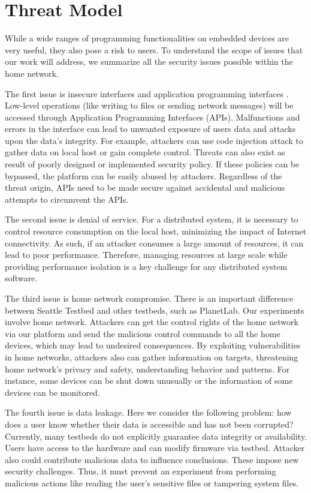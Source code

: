 \section{Threat Model}
\label{sec.threat_model}
While a wide ranges of programming functionalities on embedded devices are 
very useful, they also pose a risk to users. To understand the scope of 
issues that our work will address, we summarize all the security issues 
possible within the home network.

The first issue is insecure interfaces and application programming interfaces
. Low-level operations (like writing to files or sending network messages) 
will be accessed through Application Programming Interfaces (APIs). 
Malfunctions and errors in the interface can lead to unwanted exposure of 
users data and attacks upon the data's integrity. For example, attackers can 
use code injection attack to gather data on local host or gain complete 
control. Threats can also exist as result of poorly designed or implemented 
security policy. If these policies can be bypassed, the platform can be 
easily abused by attackers. Regardless of the threat origin, APIs need to be 
made secure against accidental and malicious attempts to circumvent the APIs.

The second issue is denial of service. For a distributed system, it is 
necessary to control resource consumption on the local host, minimizing the 
impact of Internet connectivity. As such, if an attacker consumes a large 
amount of resources, it can lead to poor performance. Therefore, managing 
resources at large scale while providing performance isolation is a key 
challenge for any distributed system software.

The third issue is home network compromise. There is an important difference 
between Seattle Testbed and other testbeds, such as PlanetLab. Our 
experiments involve home network. Attackers can get the control rights of 
the home network via our platform and send the malicious control commands to 
all the home devices, which may lead to undesired consequences. By 
exploiting vulnerabilities in home networks, attackers also can gather 
information on targets, threatening home network's privacy and safety, 
understanding behavior and patterns. For instance, some devices can be shut 
down unusually or the information of some devices can be monitored.

The fourth issue is data leakage. Here we consider the following problem: 
how does a user know whether their data is accessible and has not been 
corrupted? Currently, many testbeds do not explicitly guarantee data 
integrity or availability. Users have access to the hardware and can modify 
firmware via testbed. Attacker also could contribute malicious data to 
influence conclusions. These impose new security challenges. Thus, it must 
prevent an experiment from performing malicious actions like reading the 
user's sensitive files or tampering system files.